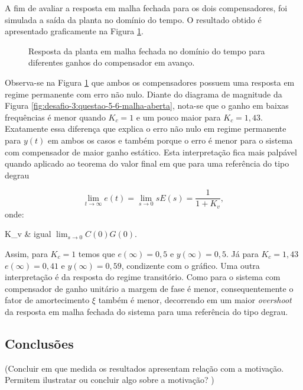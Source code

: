 A fim de avaliar a resposta em malha fechada para os dois compensadores, foi
simulada a saída da planta no domínio do tempo. O resultado obtido é apresentado
graficamente na Figura \ref{fig:desafio-3:questao-7-dominio-do-tempo}.

\begin{figure}[ht!]
    \caption{Resposta da planta em malha fechada no domínio do tempo para
    diferentes ganhos do compensador em avanço.}
    \vspace{-10pt}
    \hspace{-30pt}
    \label{fig:desafio-3:questao-7-dominio-do-tempo}
    \begin{minipage}{\linewidth}
        
    \end{minipage}
\end{figure}

Observa-se na Figura \ref{fig:desafio-3:questao-7-dominio-do-tempo} que ambos os
compensadores possuem uma resposta em regime permanente com erro não nulo.
Diante do diagrama de magnitude da Figura
\ref{fig:desafio-3:questao-5-6-malha-aberta}, nota-se que o ganho em baixas
frequências é menor quando $K_c = 1$ e um pouco maior para $K_c = 1,43$.
Exatamente essa diferença que explica o erro não nulo em regime permanente para
$y(t)$ em ambos os casos e também porque o erro é menor para o sistema com
compensador de maior ganho estático. Esta interpretação fica mais palpável
quando aplicado ao teorema do valor final em que para uma referência do tipo
degrau

\begin{equation}
    \label{eq:desafio3-teorema-do-valor-final}
    \lim_{t \rightarrow \infty }e(t)=\lim_{s \rightarrow 0 }sE(s)=\frac{1}{1+K_v},
\end{equation}
onde:

\begin{conditions*}
    K_v & igual $\lim_{s \rightarrow 0 }C(0)G(0)$.
\end{conditions*}

Assim, para $K_c = 1$ temos que $e(\infty) = 0,5$ e $y(\infty) = 0,5$. Já para
$K_c = 1,43$ $e(\infty) = 0,41$ e $y(\infty) = 0,59$, condizente com o gráfico.
Uma outra interpretação é da resposta do regime transitório. Como para o sistema
com compensador de ganho unitário a margem de fase é menor, consequentemente
o fator de amortecimento $\xi$ também é menor, decorrendo em um maior
\textit{overshoot} da resposta em malha fechada do sistema para uma referência
do tipo degrau.

\subsection{Conclusões}
(Concluir em que medida os resultados apresentam relação com a motivação.
Permitem ilustratar ou concluir algo sobre a motivação? )
